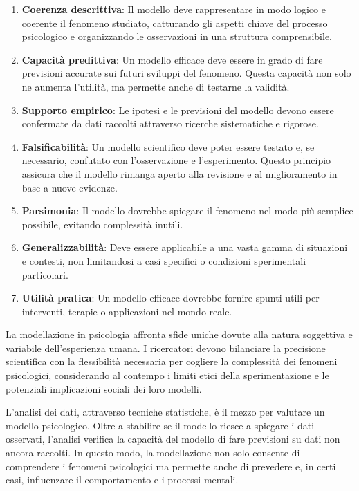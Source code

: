 \documentclass[
  letterpaper,
  DIV=11,
  numbers=noendperiod]{scrreprt}
\theoremstyle{definition}
\theoremstyle{remark}
\begin{document}
\begin{enumerate}
\def\labelenumi{\arabic{enumi}.}
\item
  \textbf{Coerenza descrittiva}: Il modello deve rappresentare in modo
  logico e coerente il fenomeno studiato, catturando gli aspetti chiave
  del processo psicologico e organizzando le osservazioni in una
  struttura comprensibile.
\item
  \textbf{Capacità predittiva}: Un modello efficace deve essere in grado
  di fare previsioni accurate sui futuri sviluppi del fenomeno. Questa
  capacità non solo ne aumenta l'utilità, ma permette anche di testarne
  la validità.
\item
  \textbf{Supporto empirico}: Le ipotesi e le previsioni del modello
  devono essere confermate da dati raccolti attraverso ricerche
  sistematiche e rigorose.
\item
  \textbf{Falsificabilità}: Un modello scientifico deve poter essere
  testato e, se necessario, confutato con l'osservazione e
  l'esperimento. Questo principio assicura che il modello rimanga aperto
  alla revisione e al miglioramento in base a nuove evidenze.
\item
  \textbf{Parsimonia}: Il modello dovrebbe spiegare il fenomeno nel modo
  più semplice possibile, evitando complessità inutili.
\item
  \textbf{Generalizzabilità}: Deve essere applicabile a una vasta gamma
  di situazioni e contesti, non limitandosi a casi specifici o
  condizioni sperimentali particolari.
\item
  \textbf{Utilità pratica}: Un modello efficace dovrebbe fornire spunti
  utili per interventi, terapie o applicazioni nel mondo reale.
\end{enumerate}

La modellazione in psicologia affronta sfide uniche dovute alla natura
soggettiva e variabile dell'esperienza umana. I ricercatori devono
bilanciare la precisione scientifica con la flessibilità necessaria per
cogliere la complessità dei fenomeni psicologici, considerando al
contempo i limiti etici della sperimentazione e le potenziali
implicazioni sociali dei loro modelli.

L'analisi dei dati, attraverso tecniche statistiche, è il mezzo per
valutare un modello psicologico. Oltre a stabilire se il modello riesce
a spiegare i dati osservati, l'analisi verifica la capacità del modello
di fare previsioni su dati non ancora raccolti. In questo modo, la
modellazione non solo consente di comprendere i fenomeni psicologici ma
permette anche di prevedere e, in certi casi, influenzare il
comportamento e i processi mentali.
\end{document}
